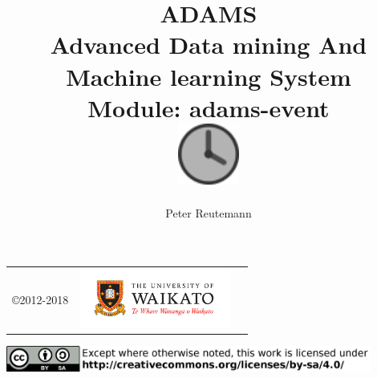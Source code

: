 \documentclass[a4paper]{book}
\title{
  \textbf{ADAMS} \\
  {\Large \textbf{A}dvanced \textbf{D}ata mining \textbf{A}nd \textbf{M}achine
  learning \textbf{S}ystem} \\
  {\Large Module: adams-event} \\
  \vspace{1cm}
  \includegraphics[width=2cm]{images/event-module.png} \\
}
\author{
  Peter Reutemann
}
\begin{document}
\begin{titlepage}
\maketitle

\thispagestyle{empty}
\center
\begin{table}[b]
	\begin{tabular}{c l l}
		\parbox[c][2cm]{2cm}{\copyright 2012-2018} &
		\parbox[c][2cm]{5cm}{\includegraphics[width=5cm]{images/coat_of_arms.pdf}} \\
	\end{tabular}
	\includegraphics[width=12cm]{images/cc.png} \\
\end{table}

\end{titlepage}

\tableofcontents
\listoffigures

\end{document}
